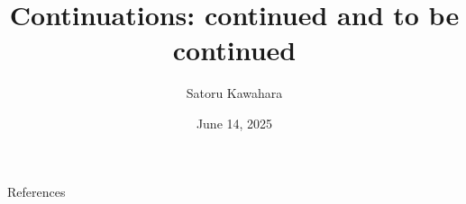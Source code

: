 \documentclass[unicode,compress,14pt,CJK,aspectratio=169,xcolor={dvipsnames},t%
  \directlua{
    handout = os.getenv"HANDOUT"
    local _ = handout and tex.print(",handout")
}]{beamer}
\title{Continuations: continued and to be continued}
\author{Satoru Kawahara}
\date{June 14, 2025}
\institute{関数型まつり2025}
\begin{document}

% 



% 
% 


\switchfooter
\begin{frame}[allowframebreaks]{References}
	\printbibliography
\end{frame}
\end{document}
